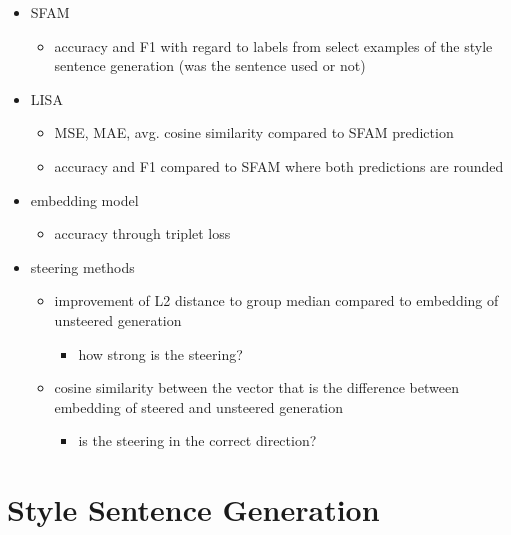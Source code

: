 \begin{itemize}
  \item SFAM
        \begin{itemize}
          \item accuracy and F1 with regard to labels from select examples of the style sentence generation (was the sentence used or not)
        \end{itemize}
  \item LISA
        \begin{itemize}
          \item MSE, MAE, avg. cosine similarity compared to SFAM prediction
          \item accuracy and F1 compared to SFAM where both predictions are rounded
        \end{itemize}
  \item embedding model
        \begin{itemize}
          \item accuracy through triplet loss
        \end{itemize}
  \item steering methods
        \begin{itemize}
          \item improvement of L2 distance to group median compared to embedding of unsteered generation
                \begin{itemize}
                  \item how strong is the steering?
                \end{itemize}
          \item cosine similarity between the vector that is the difference between embedding of steered and unsteered generation
                \begin{itemize}
                  \item is the steering in the correct direction?
                \end{itemize}
        \end{itemize}
\end{itemize}


\section{Style Sentence Generation}
\label{sec:approach:style_sentence_generation}

